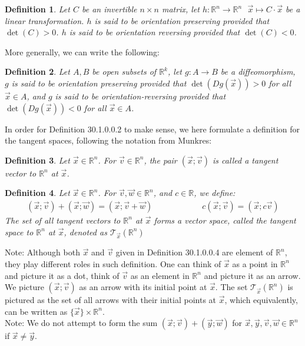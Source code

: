 \documentclass[11pt,oneside]{book}
\theoremstyle{break}
\theoremstyle{break}
\newtheorem{defn}{Definition}[corL]
\newcommand{\R}{\mathbb{R}}
\newcommand{\T}{\mathcal{T}}
\newcommand{\note}{\color{red}Note: \color{black}}
\begin{document}
\begin{defn}
Let $C$ be an invertible $n\times n$ matrix, let $h:\R^n \to \R^n \ \ \ \vec{x}\mapsto C\cdot \vec{x}$ be a linear transformation. $h$ is said to be orientation preserving provided that $\det(C)>0$. $h$ is said to be orientation reversing provided that $\det(C)<0$. 
\end{defn}

More generally, we can write the following:
\begin{defn}
Let $A,B$ be open subsets of $\R^k$, let $g:A \to B$ be a diffeomorphism, $g$ is said to be orientation preserving provided that $\det(Dg(\vec{x}))>0$ for all $\vec{x}\in A$, and $g$ is said to be orientation-reversing provided that $\det(Dg(\vec{x}))<0$ for all $\vec{x}\in A$. 
\end{defn}

In order for Definition 30.1.0.0.2 to make sense, we here formulate a definition for the tangent spaces, following the notation from Munkres:
\begin{defn}
Let $\vec{x}\in \R^n$. For $\vec{v}\in \R^n$, the pair $(\vec{x};\vec{v})$ is called a tangent vector to $\R^n$ at $\vec{x}$. 
\end{defn}

\begin{defn}
Let $\vec{x}\in \R^n$. For $\vec{v},\vec{w}\in \R^n$, and $c \in \R$, we define:
\begin{align*}
(\vec{x};\vec{v}) + (\vec{x};\vec{w}) = (\vec{x}; \vec{v}+\vec{w})\qquad\qquad\qquad c(\vec{x};\vec{v}) = (\vec{x};c\vec{v})
\end{align*}
The set of all tangent vectors to $\R^n$ at $\vec{x}$ forms a vector space, called the tangent space to $\R^n$ at $\vec{x}$, denoted as $\T_{\vec{x}}(\R^n)$
\end{defn}

\note Although both $\vec{x}$ and $\vec{v}$ given in Definition 30.1.0.0.4 are element of $\R^n$, they play different roles in such definition. One can think of $\vec{x}$ as a point in $\R^n$ and picture it as a dot, think of $\vec{v}$ as an element in $\R^n$ and picture it as an arrow. We picture $(\vec{x};\vec{v})$ as an arrow with its initial point at $\vec{x}$. The set $\T_{\vec{x}}(\R^n)$ is pictured as the set of all arrows with their initial points at $\vec{x}$, which equivalently, can be written as $\{\vec{x}\}\times \R^n$. \\

\note We do not attempt to form the sum $(\vec{x};\vec{v})+(\vec{y};\vec{w})$ for $\vec{x},\vec{y},\vec{v},\vec{w} \in \R^n$ if $\vec{x}\neq \vec{y}$.
\end{document}
